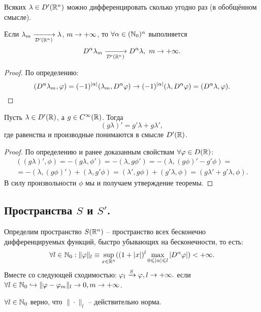\begin{note}
    Всяких $\lambda \in D'(\mathbb{R}^n)$ можно дифференцировать сколько угодно раз (в обобщённом смысле).
\end{note}
\begin{lemma}
    Если $\lambda_m \xrightarrow[\mathcal{D}'(\mathbb{R}^n)]{} \lambda$, $m \rightarrow +\infty$, то $\forall \alpha \in (\mathbb{N}_0)^n$ выполняется
    \[
        D^{\alpha} \lambda_m \xrightarrow[\mathcal{D}'(\mathbb{R}^n)]{} D^{\alpha} \lambda,\  m \rightarrow +\infty.
    \]
\end{lemma}
\begin{proof}
    По определению:
    \[
        (D^{\alpha} \lambda_m, \varphi) = (-1)^{|\alpha|} (\lambda_m, D^{\alpha} \varphi) \rightarrow (-1)^{|\alpha|}(\lambda, D^{\alpha}\varphi) = (D^{\alpha} \lambda, \varphi).
    \]
\end{proof}
\begin{theorem}
    Пусть $\lambda \in D'(\mathbb{R})$, а $g \in C^\infty(\mathbb{R})$.
    Тогда
    \[
        (g\lambda)' = g' \lambda + g \lambda',
    \]
    где равенства и производные понимаются в смысле $D'(\mathbb{R})$.
\end{theorem}
\begin{proof}
    По определению и ранее доказанным свойствам $\forall \varphi \in D(\mathbb{R})$:
    \begin{multline*}
        ((g\lambda)', \phi) = -(g \lambda, \phi') = -(\lambda, g \phi') = -(\lambda, (g\phi)' - g'\phi) = \\ = -(\lambda, (g\phi)') + (\lambda, g' \phi) = (\lambda', g\phi) + (g'\lambda, \phi) = (g\lambda' + g'\lambda, \phi).
    \end{multline*}
    В силу произвольности $\phi$ мы и получаем утверждение теоремы.
\end{proof}
\subsection{Пространства $S$ и $S'$.}
\begin{definition}
    Определим пространство $S(\mathbb{R}^n)$ -- пространство всех бесконечно дифференцируемых функций, быстро убывающих на бесконечности, то есть:
    \[
        \forall l \in \mathbb{N}_0: \|\varphi\|_l \equiv \sup\limits_{x \in \mathbb{R}^n} ((1 + |x|)^l \max\limits_{0 \leqslant |\alpha| \leqslant l} |D^{\alpha} \varphi|) < +\infty.
    \]
    Вместе со следующей сходимостью:
    $\varphi_l \xrightarrow{S} \varphi, l \rightarrow +\infty.$
    если $\forall l \in \mathbb{N}_0 \hookrightarrow \|\varphi - \varphi_m\|_l \rightarrow 0, m \rightarrow +\infty$.
\end{definition}
\begin{note}
    $\forall l \in \mathbb{N}_0$ верно, что $\|\cdot \|_l$ -- действительно норма.
\end{note}

